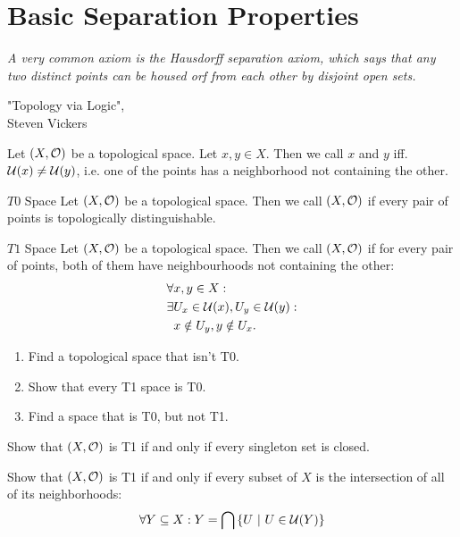 \section{Basic Separation Properties}
\epigraph{
	\textit{A very common axiom is the Hausdorff separation axiom, which says that any two distinct points can be housed orf from each other by disjoint open sets.}}{{"Topology via Logic",}\\{Steven Vickers}}
\begin{definition}
	Let $(X, \mathcal{O})$ be a topological space. Let $x,y \in X$. Then we call $x$ and $y$  iff. $\mathcal{U}(x) \neq \mathcal{U}(y)$, i.e. one of the points has a neighborhood not containing the other.
\end{definition}
\begin{importantdefinition}{$T0$ Space}{}
	Let $(X, \mathcal{O})$ be a topological space. Then we call $(X,\mathcal{O})$  if every pair of points is topologically distinguishable.
\end{importantdefinition}
\begin{importantdefinition}{$T1$ Space}{}
	Let $(X, \mathcal{O})$ be a topological space. Then we call $(X,\mathcal{O})$  if for every pair of points, both of them have neighbourhoods not containing the other:
	\begin{align*}
		\forall &x,y \in X:\\
		\exists &U_x \in \mathcal{U}(x), U_y \in \mathcal{U}(y):\\
		&x \notin U_y, y \notin U_x.
	\end{align*}
\end{importantdefinition}
\begin{exercise}
	\begin{enumerate}
		\item Find a topological space that isn't T0.
		\item Show that every T1  space is T0.
		\item Find a space that is T0, but not T1.
	\end{enumerate}	
\end{exercise}
\begin{exercise}
	Show that $(X, \mathcal{O})$ is T1 if and only if every singleton set is closed.
\end{exercise}
\begin{exercise}
	Show that $(X, \mathcal{O})$ is T1 if and only if every subset of $X$ is the intersection of all of its neighborhoods:
	\begin{align*}
		\forall Y \subseteq X : Y = \bigcap \qty{U ~\middle|~U \in \mathcal{U}(Y)}
	\end{align*}
\end{exercise}
